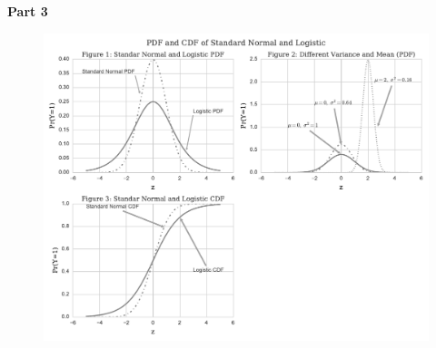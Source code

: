 \documentclass[12pt]{article}
\begin{document}
\FloatBarrier

\textbf{Part 3}
\begin{figure}[h!]
\centering
\caption{}
\includegraphics[width=1\textwidth]{Figure123.pdf}
\end{figure}

\FloatBarrier
\end{document}
